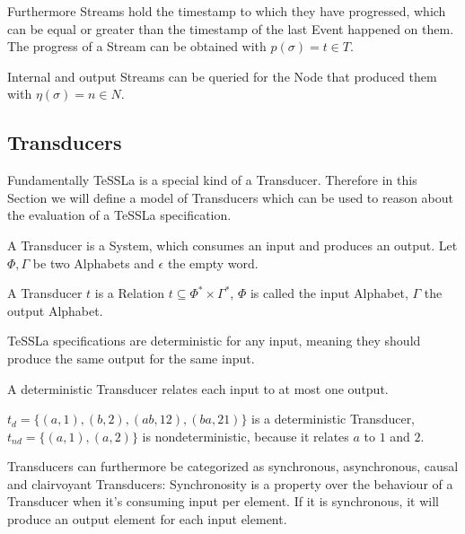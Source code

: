 Furthermore Streams hold the timestamp to which they have progressed, which can be equal or greater than the timestamp of the last Event happened on them.
The progress of a Stream can be obtained with \(p(\sigma) = t \in T\).

Internal and output Streams can be queried for the Node that produced them with \(\eta(\sigma) = n \in N\).

\subsection{Transducers}
\label{sec:concepts:defs:transducers}

Fundamentally TeSSLa is a special kind of a Transducer.
Therefore in this Section we will define a model of Transducers which can be used to reason about the evaluation of a TeSSLa specification.

A Transducer is a System, which consumes an input and produces an output.
Let \(\Phi, \Gamma\) be two Alphabets and \(\epsilon\) the empty word.

\begin{definition}[name = Transducer]\label{def:transducer}
  A Transducer \(t\) is a Relation \(t \subseteq \Phi^* \times \Gamma^*\), \(\Phi\) is called the input Alphabet, \(\Gamma\) the output Alphabet.
\end{definition}


TeSSLa specifications are deterministic for any input, meaning they should produce the same output for the same input.

\begin{definition}[name = Deterministic Transducer]\label{def:deterministic_transducer}
  A deterministic Transducer relates each input to at most one output.
\end{definition}

\begin{exmp}[name = Deterministic and Nondeterministic Transducers]
  \(t_d = \{(a,1),(b,2),(ab,12),(ba,21)\}\) is a deterministic Transducer, \(t_{nd} = \{(a,1),(a,2)\}\) is nondeterministic, because it relates \(a\) to \(1\) and \(2\).
\end{exmp}

Transducers can furthermore be categorized as synchronous, asynchronous, causal and clairvoyant Transducers:
Synchronosity is a property over the behaviour of a Transducer when it's consuming input per element.
If it is synchronous, it will produce an output element for each input element.

